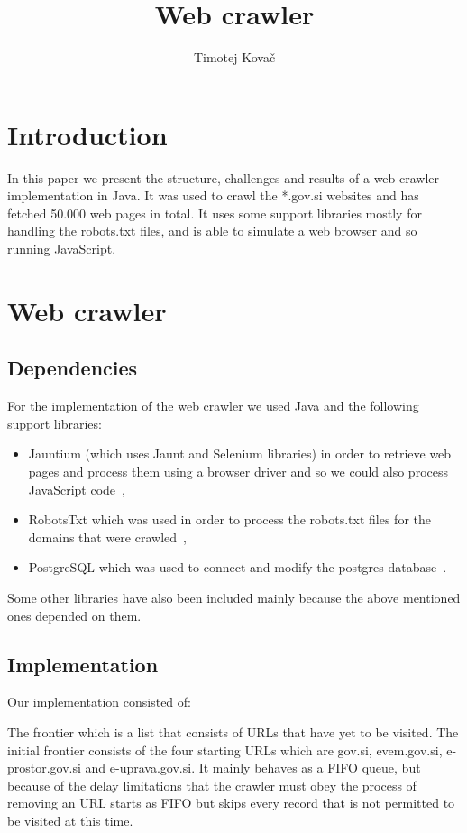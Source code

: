 \documentclass[9pt]{IEEEtran}
\title{\vspace{0ex}
Web crawler}
\author{Timotej Kovač\vspace{-4.0ex}}
\begin{document}
\maketitle

\section{Introduction}

In this paper we present the structure, challenges and results of a web crawler implementation in Java.
It was used to crawl the *.gov.si websites and has fetched 50.000 web pages in total.
It uses some support libraries mostly for handling the robots.txt files, and is able to simulate a web browser and so running JavaScript.


\section{Web crawler}

\subsection{Dependencies}

For the implementation of the web crawler we used Java and the following support libraries:
\begin{itemize}
\item{Jauntium (which uses Jaunt and Selenium libraries) in order to retrieve web pages and process them using a browser driver and so we could also process JavaScript code~\cite{jauntium},}
\item{RobotsTxt which was used in order to process the robots.txt files for the domains that were crawled~\cite{robots_txt}, }
\item{PostgreSQL which was used to connect and modify the postgres database~\cite{postgres}.}
\end{itemize}
Some other libraries have also been included mainly because the above mentioned ones depended on them.

\subsection{Implementation}
Our implementation consisted of:

The frontier which is a list that consists of URLs that have yet to be visited.
The initial frontier consists of the four starting URLs which are gov.si, evem.gov.si, e-prostor.gov.si and e-uprava.gov.si.
It mainly behaves as a FIFO queue, but because of the delay limitations that the crawler must obey the process of removing an URL starts as FIFO but skips every record that is not permitted to be visited at this time.
\end{document}
